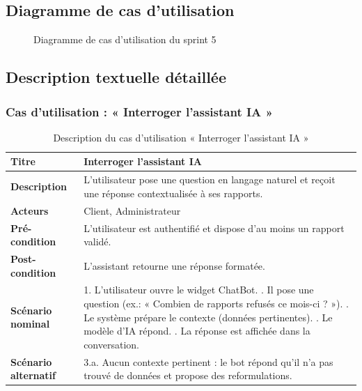 \subsection{Diagramme de cas d'utilisation}
\begin{figure}[h!]
\centering
{}
\caption{Diagramme de cas d'utilisation du sprint 5}
\end{figure}

\subsection{Description textuelle détaillée}

\subsubsection{Cas d'utilisation : « Interroger l'assistant IA »}
\begin{table}[h!]
\centering
\renewcommand{\arraystretch}{1.3}
\begin{tabularx}{\textwidth}{|l|X|}
\hline
\textbf{Titre} & Interroger l'assistant IA \\ \hline
\textbf{Description} & L'utilisateur pose une question en langage naturel et reçoit
une réponse contextualisée à ses rapports. \\ \hline
\textbf{Acteurs} & Client, Administrateur \\ \hline
\textbf{Pré-condition} & L'utilisateur est authentifié et dispose d'au moins un
rapport validé. \\ \hline
\textbf{Post-condition} & L'assistant retourne une réponse formatée. \\ \hline
\textbf{Scénario nominal} &
1. L'utilisateur ouvre le widget ChatBot. \newline
2. Il pose une question (ex.: « Combien de rapports refusés ce mois-ci ? »). \newline
3. Le système prépare le contexte (données pertinentes). \newline
4. Le modèle d'IA répond. \newline
5. La réponse est affichée dans la conversation. \\ \hline
\textbf{Scénario alternatif} &
3.a. Aucun contexte pertinent : le bot répond qu'il n'a pas trouvé de données et
propose des reformulations. \\ \hline
\end{tabularx}
\caption{Description du cas d'utilisation « Interroger l'assistant IA »}
\end{table}

